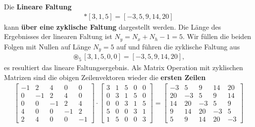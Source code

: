 \begin{ExCalc}
Die \textbf{Lineare Faltung}
\begin{align}
[-1,2,4] \ast [3,1,5] = [-3,5,9,14,20]
\end{align}
kann \textbf{über eine zyklische Faltung} dargestellt werden.
Die Länge des Ergebnisses der linearen Faltung ist  $N_y = N_x+N_h-1=5$.
Wir füllen die beiden Folgen mit Nullen auf Länge $N_y=5$ auf und führen die
zyklische Faltung aus
\begin{align}
[-1,2,4,0,0] \circledast_5 [3,1,5,0,0] = [-3,5,9,14,20],
\end{align}
es resultiert das lineare Faltungsergebnis.
Als Matrix Operation mit zyklischen Matrizen sind
die obigen Zeilenvektoren wieder die \textbf{ersten Zeilen}
\begin{align}
\label{eq:C8864C8D9F_LinConv_with_CycConv}
\begin{bmatrix}
-1  &   2  &   4  &   0  &   0\\
 0  &  -1  &   2  &   4  &   0\\
 0  &   0  &  -1  &   2  &   4\\
 4  &   0  &   0  &  -1  &   2\\
 2  &   4  &   0  &   0  &  -1
\end{bmatrix}
\cdot
\begin{bmatrix}
3  &   1  &   5  &   0  &   0\\
0  &   3  &   1  &   5  &   0\\
0  &   0  &   3  &   1  &   5\\
5  &   0  &   0  &   3  &   1\\
1  &   5  &   0  &   0  &   3
\end{bmatrix}
=
\begin{bmatrix}
-3  &   5  &   9  &  14  &  20\\
20  &  -3  &   5  &   9  &  14\\
14  &  20  &  -3  &   5  &   9\\
 9  &  14  &  20  &  -3  &   5\\
 5  &   9  &  14  &  20  &  -3
\end{bmatrix}
\end{align}


\end{ExCalc}
